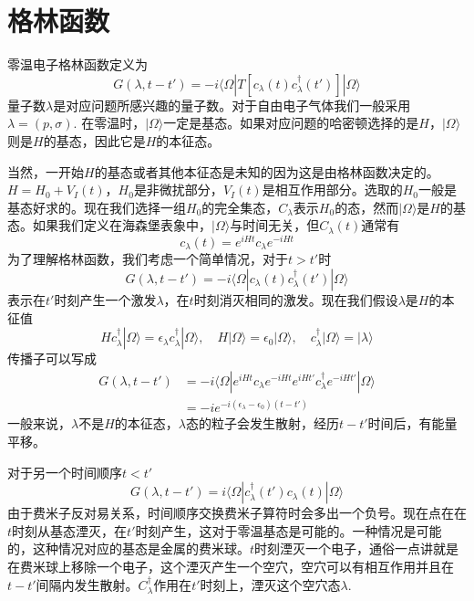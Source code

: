 \documentclass[a4paper,14pt]{article}
\begin{document}
\section{格林函数}
零温电子格林函数定义为
\begin{equation*}
    G(\lambda,t-t')=-i\langle\Omega|T[c_\lambda(t)c_\lambda^\dagger(t')]|\Omega\rangle
\end{equation*}
量子数$\lambda$是对应问题所感兴趣的量子数。对于自由电子气体我们一般采用$\lambda=(p,\sigma)$. 在零温时，$|\Omega\rangle$一定是基态。如果对应问题的哈密顿选择的是$H$，$|\Omega\rangle$则是$H$的基态，因此它是$H$的本征态。

当然，一开始$H$的基态或者其他本征态是未知的因为这是由格林函数决定的。$H=H_0+V_I(t)$，$H_0$是非微扰部分，$V_I(t)$是相互作用部分。选取的$H_0$一般是基态好求的。现在我们选择一组$H_0$的完全集态，$C_\lambda$表示$H_0$的态，然而$|\Omega\rangle$是$H$的基态。如果我们定义在海森堡表象中，$|\Omega\rangle$与时间无关，但$C_\lambda(t)$通常有
\begin{equation*}
    c_\lambda(t)=e^{iHt}c_\lambda e^{-iHt}
\end{equation*}
为了理解格林函数，我们考虑一个简单情况，对于$t>t'$时
\begin{equation*}
    G(\lambda,t-t')=-i\langle\Omega|c_\lambda(t)c_\lambda^\dagger(t')|\Omega\rangle
\end{equation*}
表示在$t'$时刻产生一个激发$\lambda$，在$t$时刻消灭相同的激发。现在我们假设$\lambda$是$H$的本征值
\begin{equation*}
    Hc_\lambda^\dagger|\Omega\rangle=\epsilon_\lambda c_\lambda^\dagger|\Omega\rangle,\quad H|\Omega\rangle=\epsilon_0|\Omega\rangle,\quad c_\lambda^\dagger|\Omega\rangle=|\lambda\rangle
\end{equation*}
传播子可以写成
\begin{equation*}
    \begin{split}
        G(\lambda,t-t')&=-i\langle\Omega|e^{iHt}c_\lambda e^{-iHt}e^{iHt'}c_\lambda^\dagger e^{-iHt'}|\Omega\rangle\\
        &=-ie^{-i(\epsilon_\lambda-\epsilon_0)(t-t')}
    \end{split}
\end{equation*}
一般来说，$\lambda$不是$H$的本征态，$\lambda$态的粒子会发生散射，经历$t-t'$时间后，有能量平移。

对于另一个时间顺序$t<t'$
\begin{equation*}
    G(\lambda,t-t')=i\langle\Omega|c_\lambda^\dagger(t')c_\lambda(t)|\Omega\rangle
\end{equation*}
由于费米子反对易关系，时间顺序交换费米子算符时会多出一个负号。现在点在在$t$时刻从基态湮灭，在$t'$时刻产生，这对于零温基态是可能的。一种情况是可能的，这种情况对应的基态是金属的费米球。$t$时刻湮灭一个电子，通俗一点讲就是在费米球上移除一个电子，这个湮灭产生一个空穴，空穴可以有相互作用并且在$t-t'$间隔内发生散射。$C_\lambda^\dagger$作用在$t'$时刻上，湮灭这个空穴态$\lambda$.
\end{document}
